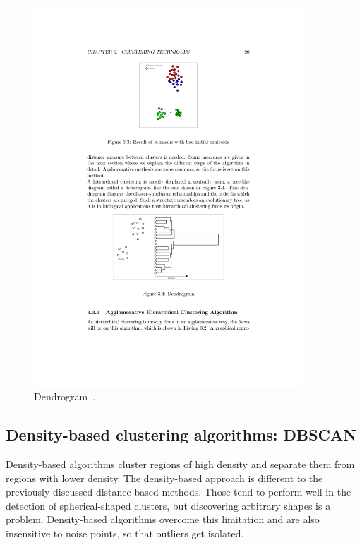 \begin{figure}[h]
  \begin{center}
    \includegraphics[width=0.9\textwidth]{figures/clustering_hierarchical_dendrogram.pdf}
    \caption{Dendrogram~\cite[p 20]{Meert06clustermaps}.}
    \label{fig:clustering-hierarchical-dendrogram}
  \end{center}
\end{figure}

\FloatBarrier
\subsection{Density-based clustering algorithms: DBSCAN}

Density-based algorithms cluster regions of high density and separate them from regions with lower density. The density-based approach is different to the previously discussed distance-based methods. Those tend to perform well in the detection of spherical-shaped clusters, but discovering arbitrary shapes is a problem. Density-based algorithms overcome this limitation and are also insensitive to noise points, so that outliers get isolated.

